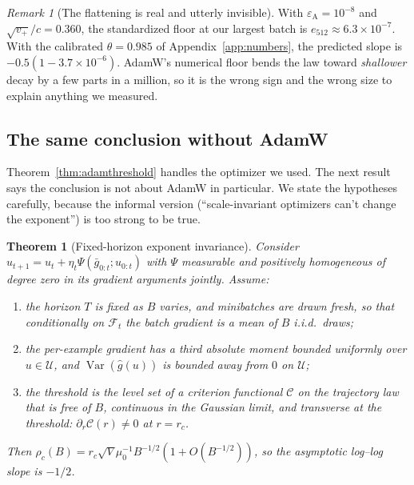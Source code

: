 \documentclass{article}
\theoremstyle{plain}
\newtheorem{theorem}{Theorem}
\theoremstyle{definition}
\theoremstyle{remark}
\newtheorem{remark}{Remark}
\newcommand{\Var}{\operatorname{Var}}
\newcommand{\1}{\mathbf{1}}
\newcommand{\cU}{\mathcal{U}}
\newcommand{\cF}{\mathcal{F}}
\begin{document}
\begin{remark}[The flattening is real and utterly invisible]
\label{rem:epsnumeric}
With $\varepsilon_{\mathrm A} = 10^{-8}$ and $\sqrt{v_+}/c = 0.360$, the
standardized floor at our largest batch is $e_{512}\approx6.3\times10^{-7}$. With
the calibrated $\theta = 0.985$ of Appendix~\ref{app:numbers}, the predicted
slope is $-0.5(1-3.7\times10^{-6})$. AdamW's numerical floor bends the law toward
\emph{shallower} decay by a few parts in a million, so it is the wrong sign and
the wrong size to explain anything we measured.
\end{remark}

\subsection{The same conclusion without AdamW}

Theorem~\ref{thm:adamthreshold} handles the optimizer we used. The next result
says the conclusion is not about AdamW in particular. We state the hypotheses
carefully, because the informal version (``scale-invariant optimizers can't change
the exponent'') is too strong to be true.

\begin{theorem}[Fixed-horizon exponent invariance]
\label{thm:noexp}
Consider $u_{t+1} = u_t + \eta_t\Psi(\bar g_{0:t}; u_{0:t})$ with $\Psi$
measurable and positively homogeneous of degree zero in its gradient arguments
jointly. Assume:
\begin{enumerate}[leftmargin=*,itemsep=1pt,label=(H\arabic*)]
\item the horizon $T$ is fixed as $B$ varies, and minibatches are drawn fresh, so
that conditionally on $\cF_t$ the batch gradient is a mean of $B$ i.i.d.\ draws;
\item the per-example gradient has a third absolute moment bounded uniformly over
$u\in\cU$, and $\Var(\hat g(u))$ is bounded away from $0$ on $\cU$;
\item the threshold is the level set of a criterion functional $\mathcal C$ on
the trajectory law that is free of $B$, continuous in the Gaussian limit, and
\emph{transverse} at the threshold: $\partial_r\mathcal C(r)\ne0$ at $r = r_c$.
\end{enumerate}
Then $\rho_c(B) = r_c\sqrt V\mu_0^{-1}B^{-1/2}(1+O(B^{-1/2}))$, so the asymptotic
log--log slope is $-1/2$.
\end{theorem}
\end{document}
